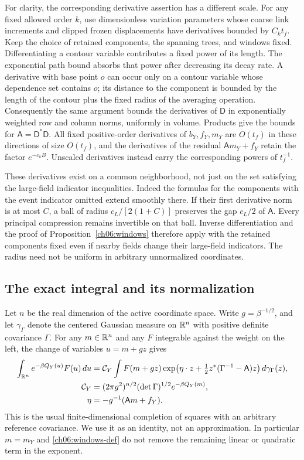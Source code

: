 For clarity, the corresponding derivative assertion has a different
scale. For any fixed allowed order $k$, use dimensionless variation
parameters whose coarse link increments and clipped frozen displacements
have derivatives bounded by $C_k t_f$. Keep the choice of retained components, the spanning trees, and
windows fixed. Differentiating a contour variable contributes a fixed power of its
length. The exponential path bound absorbs that power after decreasing
its decay rate. A derivative with base point $o$ can occur only on a contour variable
whose dependence set contains $o$; its distance to the component is bounded
by the length of the contour plus the fixed radius of the averaging operation. Consequently the
same argument bounds the derivatives of $\mathsf D$ in exponentially
weighted row and column norms, uniformly in volume. Products give the
bounds for $\mathsf A=\mathsf D^*\mathsf D$. All fixed positive-order
derivatives of $b_Y,f_Y,m_Y$ are $O(t_f)$ in these directions of size $O(t_f)$,
and the derivatives of the residual $\mathsf Am_Y+f_Y$ retain the factor $e^{-c_kB}$.
Unscaled derivatives instead carry the corresponding powers of $t_f^{-1}$.

These derivatives exist on a common neighborhood, not just on the
set satisfying the large-field indicator inequalities. Indeed the formulas for the components with the event indicator omitted
extend smoothly there. If their first derivative norm is at most $C$,
a ball of radius $c_L/[2(1+C)]$ preserves the gap $c_L/2$ of $\mathsf A$.
Every principal compression remains invertible on that ball. Inverse
differentiation and the proof of Proposition~\ref{ch06:windows} therefore
apply with the retained components fixed even if nearby fields change their large-field indicators.
The radius need not be uniform in arbitrary unnormalized coordinates.

\subsection{The exact integral and its normalization}

Let $n$ be the real dimension of the active coordinate space. Write $g=\beta^{-1/2}$, and let $\gamma_\Gamma$ denote the centered
Gaussian measure on $\mathbb R^n$ with positive definite covariance $\Gamma$.
For any $m\in\mathbb R^n$ and any $F$ integrable against the weight on the left,
the change of variables $u=m+gz$ gives
\begin{align}
 \int_{\mathbb R^n}e^{-\beta Q_Y(u)}F(u)\,du
 &=\mathcal C_Y\int F(m+gz)
       \exp\bigl(\eta\cdot z+\tfrac12 z^*(\Gamma^{-1}-\mathsf A)z\bigr)
                                      \,d\gamma_\Gamma(z),\notag\\
 \mathcal C_Y&=(2\pi g^2)^{n/2}(\det\Gamma)^{1/2}e^{-\beta Q_Y(m)},\notag\\
 \eta&=-g^{-1}(\mathsf Am+f_Y).
 \label{ch06:gaussian-identity}
\end{align}
This is the usual finite-dimensional completion of squares with an
arbitrary reference covariance. We use it as an identity, not an
approximation. In particular $m=m_Y$ and \eqref{ch06:windows-def} do not
remove the remaining linear or quadratic term in the exponent.

